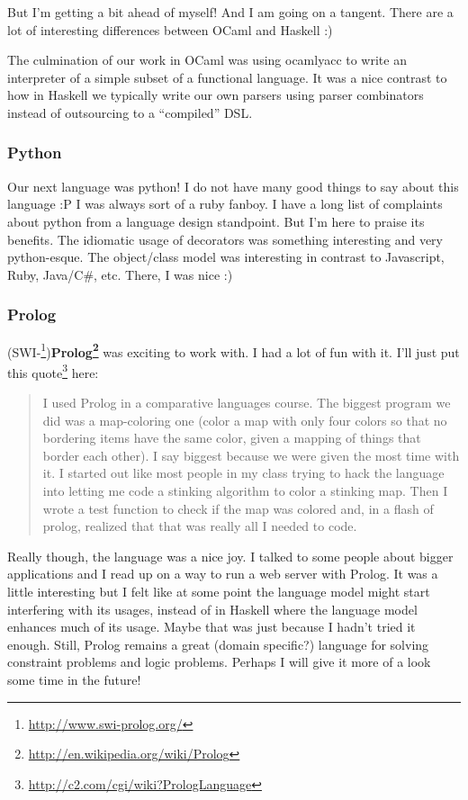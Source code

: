 \documentclass[]{article}
\renewcommand{\href}[2]{#2\footnote{\url{#1}}}
\begin{document}
But I'm getting a bit ahead of myself! And I am going on a tangent. There are a
lot of interesting differences between OCaml and Haskell :)

The culmination of our work in OCaml was using ocamlyacc to write an interpreter
of a simple subset of a functional language. It was a nice contrast to how in
Haskell we typically write our own parsers using parser combinators instead of
outsourcing to a ``compiled'' DSL.

\hypertarget{python}{%
\subsubsection{Python}\label{python}}

Our next language was python! I do not have many good things to say about this
language :P I was always sort of a ruby fanboy. I have a long list of complaints
about python from a language design standpoint. But I'm here to praise its
benefits. The idiomatic usage of decorators was something interesting and very
python-esque. The object/class model was interesting in contrast to Javascript,
Ruby, Java/C\#, etc. There, I was nice :)

\hypertarget{prolog}{%
\subsubsection{Prolog}\label{prolog}}

(\href{http://www.swi-prolog.org/}{SWI-})\textbf{\href{http://en.wikipedia.org/wiki/Prolog}{Prolog}}
was exciting to work with. I had a lot of fun with it. I'll just put
\href{http://c2.com/cgi/wiki?PrologLanguage}{this quote} here:

\begin{quote}
I used Prolog in a comparative languages course. The biggest program we did was
a map-coloring one (color a map with only four colors so that no bordering items
have the same color, given a mapping of things that border each other). I say
biggest because we were given the most time with it. I started out like most
people in my class trying to hack the language into letting me code a stinking
algorithm to color a stinking map. Then I wrote a test function to check if the
map was colored and, in a flash of prolog, realized that that was really all I
needed to code.
\end{quote}

Really though, the language was a nice joy. I talked to some people about bigger
applications and I read up on a way to run a web server with Prolog. It was a
little interesting but I felt like at some point the language model might start
interfering with its usages, instead of in Haskell where the language model
enhances much of its usage. Maybe that was just because I hadn't tried it
enough. Still, Prolog remains a great (domain specific?) language for solving
constraint problems and logic problems. Perhaps I will give it more of a look
some time in the future!
\end{document}
